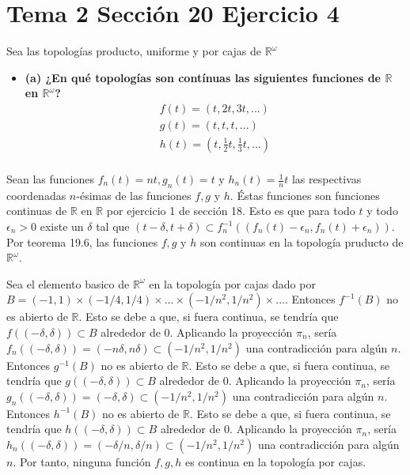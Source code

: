 \documentclass{article}
\begin{document}
\section{Tema 2 Sección 20 Ejercicio 4}
Sea las topologías producto, uniforme y por cajas de $\mathbb{R}^\omega$
\begin{itemize}
\item \bf(a) \rm  ¿En qué topologías son contínuas las siguientes funciones de $\mathbb{R}$ en $\mathbb{R}^\omega$?
\begin{eqnarray}
f(t)=(t,2t,3t,...) \nonumber\\
g(t)=(t,t,t,...) \nonumber\\
h(t)=(t,\frac{1}{2}t,\frac{1}{3}t,...) \nonumber\\
\end{eqnarray}
\end{itemize}
Sean las funciones $f_n(t)=nt, g_n(t)=t\text{ y } h_n(t)=\frac{1}{n}t$ las respectivas coordenadas $n$-ésimas de las funciones $f,g\text{ y }h$. Éstas funciones son funciones continuas de $\mathbb{R}$ en $\mathbb{R}$ por ejercicio 1 de sección 18. Esto es que para todo $t$ y todo $\epsilon_n>0$ existe un $\delta$ tal que $(t-\delta,t+\delta)\subset f_n^{-1}((f_n(t)-\epsilon_n,f_n(t)+\epsilon_n))$. Por teorema 19.6, las funciones $f,g\text{ y }h$ son continuas en la topología pruducto de $\mathbb{R}^\omega$.

 Sea el elemento basico de $\mathbb{R}^\omega$ en la topología por cajas dado por 
$B=(-1,1)\times (-1/4,1/4)\times ...\times (-1/n^2,1/n^2)\times ...$. Entonces $f^{-1}(B)$ no es abierto de $\mathbb{R}$. Esto se debe a que, si fuera continua, se tendría que  $f((-\delta,\delta))\subset B$ alrededor de 0. Aplicando la proyección $\pi_n$, sería $f_n((-\delta,\delta))=(-n\delta,n\delta)\subset(-1/n^2,1/n^2)$ una contradicción para algún $n$. Entonces $g^{-1}(B)$ no es abierto de $\mathbb{R}$. Esto se debe a que, si fuera continua, se tendría que  $g((-\delta,\delta))\subset B$ alrededor de 0. Aplicando la proyección $\pi_n$, sería $g_n((-\delta,\delta))=(-\delta,\delta)\subset(-1/n^2, 1/n^2)$ una contradicción para algún $n$. Entonces $h^{-1}(B)$ no es abierto de $\mathbb{R}$. Esto se debe a que, si fuera continua, se tendría que  $h((-\delta,\delta))\subset B$ alrededor de 0. Aplicando la proyección $\pi_n$, sería $h_n((-\delta,\delta))=(-\delta/n,\delta/n)\subset(-1/n^2,1/n^2)$ una contradicción para algún $n$. Por tanto, ninguna función $f,g,h$ es continua en la topología por cajas.
\end{document}
